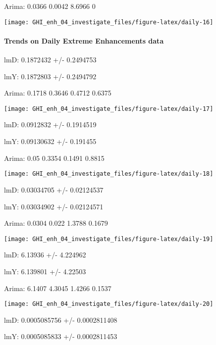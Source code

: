 \documentclass[
  10pt,
  a4paper,oneside]{article}
\begin{document}
Arima: 0.0366 0.0042 8.6966 0

\begin{center}\texttt{[image: GHI\_enh\_04\_investigate\_files/figure-latex/daily-16]} \end{center}

\newpage

\hypertarget{trends-on-daily-extreme-enhancements-data}{%
\paragraph{Trends on Daily Extreme Enhancements data}\label{trends-on-daily-extreme-enhancements-data}}

lmD: 0.1872432 +/- 0.2494753

lmY: 0.1872803 +/- 0.2494792

Arima: 0.1718 0.3646 0.4712 0.6375

\begin{center}\texttt{[image: GHI\_enh\_04\_investigate\_files/figure-latex/daily-17]} \end{center}

lmD: 0.0912832 +/- 0.1914519

lmY: 0.09130632 +/- 0.191455

Arima: 0.05 0.3354 0.1491 0.8815

\begin{center}\texttt{[image: GHI\_enh\_04\_investigate\_files/figure-latex/daily-18]} \end{center}

lmD: 0.03034705 +/- 0.02124537

lmY: 0.03034902 +/- 0.02124571

Arima: 0.0304 0.022 1.3788 0.1679

\begin{center}\texttt{[image: GHI\_enh\_04\_investigate\_files/figure-latex/daily-19]} \end{center}

lmD: 6.13936 +/- 4.224962

lmY: 6.139801 +/- 4.22503

Arima: 6.1407 4.3045 1.4266 0.1537

\begin{center}\texttt{[image: GHI\_enh\_04\_investigate\_files/figure-latex/daily-20]} \end{center}

lmD: 0.0005085756 +/- 0.0002811408

lmY: 0.0005085833 +/- 0.0002811453
\end{document}
